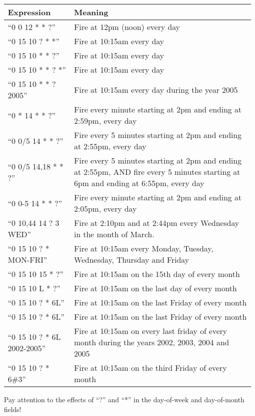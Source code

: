 \documentclass{InsightBook}
\begin{document}
\begin{tabular}{lp{12cm}}
Expression&             Meaning\\
\hline
``0 0 12 * * ?''          &Fire at 12pm (noon) every day \\
``0 15 10 ? * *''                 &Fire at 10:15am every day \\
``0 15 10 * * ?''                 &Fire at 10:15am every day \\
``0 15 10 * * ? *''               &Fire at 10:15am every day \\
``0 15 10 * * ? 2005''            &Fire at 10:15am every day during the
year 2005 \\
``0 * 14 * * ?''          &Fire every minute starting at 2pm and ending
at 2:59pm, every day \\
``0 0/5 14 * * ?''                &Fire every 5 minutes starting at 2pm
and ending at 2:55pm, every day \\
``0 0/5 14,18 * * ?''             &Fire every 5 minutes starting at 2pm
and ending at 2:55pm, AND fire every 5 minutes starting at 6pm and
ending at 6:55pm, every day \\
``0 0-5 14 * * ?''                &Fire every minute starting at 2pm and
ending at 2:05pm, every day \\
``0 10,44 14 ? 3 WED''            &Fire at 2:10pm and at 2:44pm every
Wednesday in the month of March. \\
``0 15 10 ? * MON-FRI''           &Fire at 10:15am every Monday,
Tuesday, Wednesday, Thursday and Friday \\
``0 15 10 15 * ?''                &Fire at 10:15am on the 15th day of
every month \\
``0 15 10 L * ?''                 &Fire at 10:15am on the last day of
every month \\
``0 15 10 ? * 6L''                &Fire at 10:15am on the last Friday of
every month \\
``0 15 10 ? * 6L''                &Fire at 10:15am on the last Friday of
every month \\
``0 15 10 ? * 6L 2002-2005''              &Fire at 10:15am on every last
friday of every month during the years 2002, 2003, 2004 and 2005 \\
``0 15 10 ? * 6\#3''              &Fire at 10:15am on the third Friday
of every month \\
\end{tabular}

Pay attention to the effects of ``?'' and ``*'' in the day-of-week and day-of-month fields!
\end{document}
